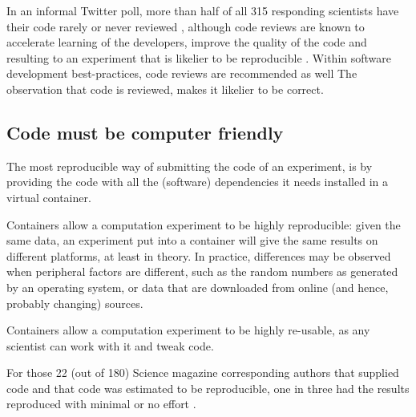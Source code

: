 In an informal Twitter poll,
more than half of all 315 responding scientists 
have their code rarely or never reviewed \cite{vable2021code},
although code reviews are known to
accelerate learning of the developers,
improve the quality of the code
and resulting to an experiment that is likelier to be reproducible
\cite{vable2021code}.
Within software development best-practices, 
code reviews are recommended as well \cite{wilson2014best} 
The observation that code is reviewed, makes it likelier to be correct.

\subsection{Code must be computer friendly}


The most reproducible way of submitting the code of an experiment,
is by providing the code with all the (software) dependencies 
it needs installed in a virtual container.


Containers allow a computation experiment to be highly reproducible:
given the same data, an experiment put into a container will give
the same results on different platforms, at least in theory.
In practice, differences may be observed when peripheral factors
are different, such as the random numbers as generated by an operating
system, or data that are downloaded from online (and hence, probably changing) sources.


Containers allow a computation experiment to be highly re-usable,
as any scientist can work with it and tweak code.


For those 22 (out of 180) Science magazine corresponding authors 
that supplied code and that code was estimated to be 
reproducible, one in three had the results reproduced with 
minimal or no effort \cite{stodden2018empirical}.

